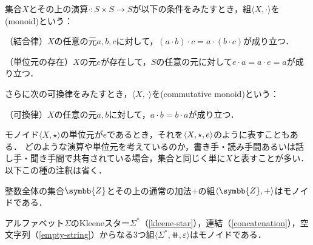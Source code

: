 \documentclass[../main.tex]{subfiles}
\begin{document}
\begin{thmbox}
\begin{definition} 集合\(X\)とその上の演算\(\mathord{\cdot}\colon S \times S \to S\)が以下の条件をみたすとき，組\(\langle X, \mathord{\cdot} \rangle\)を(monoid)という：
\begin{conditions}
    \item （結合律）\(X\)の任意の元\(a, b, c\)に対して，\((a \cdot b) \cdot c = a \cdot (b \cdot c)\)が成り立つ．
    \item （単位元の存在）\(X\)の元\(e\)が存在して，\(S\)の任意の元に対して\(e \cdot a = a \cdot e = a\)が成り立つ．
\end{conditions}
さらに次の可換律をみたすとき，\(\langle X, \mathord{\cdot} \rangle\)を(commutative monoid)という：
\begin{conditions}[resume]
    \item （可換律）\(X\)の任意の元\(a, b\)に対して，\(a \cdot b = b \cdot a\)が成り立つ．
\end{conditions}
\end{definition}
\end{thmbox}

モノイド\(\langle X, \mathord{\star} \rangle\)の単位元が\(e\)であるとき，それを\(\langle  X, \mathord{\star}, e  \rangle\)のように表すこともある．
どのような演算や単位元を考えているのか，書き手・読み手間あるいは話し手・聞き手間で共有されている場合，集合と同じく単に\(X\)と表すことが多い．以下この種の注釈は省く．

\begin{exa} 整数全体の集合\(\symbb{Z}\)とその上の通常の加法\(\mathord{+}\)の組\(\tuple{ \symbb{Z}, \mathord{+} }\)はモノイドである．
\end{exa}

\begin{exa} アルファベット\(\Sigma\)のKleeneスター\(\Sigma^{\mathord{*}}\)（\eqref{kleene-star}），連結（\eqref{concatenation}），空文字列（\eqref{empty-string}）からなる3つ組\(\langle \Sigma^{\mathord{*}}, \doubleplus, \varepsilon \rangle\)はモノイドである．
\end{exa}
\end{document}
